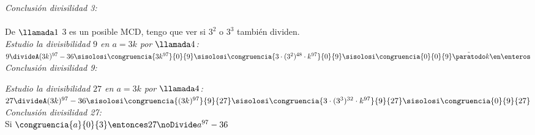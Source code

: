 \textit{Conclusión divisilidad 3: }\\
\\

De $\llamada1$ 3 es un posible MCD, tengo que ver si $3^2$ o $3^3$ también dividen.\\

\textit{Estudio la divisibilidad $9$ en $a = 3k$ por $\llamada4$:}\\
$ 9 \divideA (3k)^{97} - 36
	\sisolosi
	\congruencia{3k^{97}}{0}{9}
	\sisolosi
    \congruencia{3 \cdot (3^2)^{48}\cdot k^{97}}{0}{9}
    \sisolosi
	\congruencia{0}{0}{9}\Tilde \paratodo k \en \enteros 
$\\

\textit{Conclusión divisilidad 9: }\\


\textit{Estudio la divisibilidad $27$ en $a = 3k$ por $\llamada4$:}\\
$ 27 \divideA (3k)^{97} - 36
	\sisolosi
    \congruencia{(3k)^{97}}{9}{27}
	\sisolosi
    \congruencia{3 \cdot (3^3)^{32} \cdot k^{97}}{9}{27}
    \sisolosi
    \congruencia{0}{9}{27} 
$\\

\textit{Conclusión divisilidad 27: }\\
Si $\congruencia{a}{0}{3} \entonces 27 \noDivide a^{97} - 36$\\

